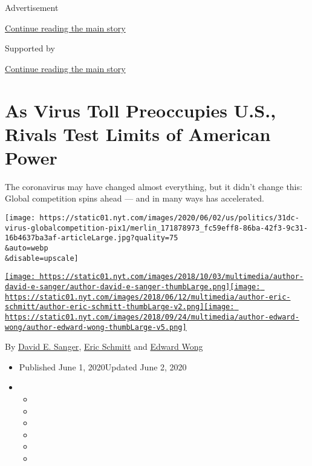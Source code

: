 Advertisement

\protect\hyperlink{after-top}{Continue reading the main story}

Supported by

\protect\hyperlink{after-sponsor}{Continue reading the main story}

\hypertarget{as-virus-toll-preoccupies-us-rivals-test-limits-of-american-power}{%
\section{As Virus Toll Preoccupies U.S., Rivals Test Limits of American
Power}\label{as-virus-toll-preoccupies-us-rivals-test-limits-of-american-power}}

The coronavirus may have changed almost everything, but it didn't change
this: Global competition spins ahead --- and in many ways has
accelerated.

\texttt{[image: https://static01.nyt.com/images/2020/06/02/us/politics/31dc-virus-globalcompetition-pix1/merlin\_171878973\_fc59eff8-86ba-42f3-9c31-16b4637ba3af-articleLarge.jpg?quality=75\\\&auto=webp\\\&disable=upscale]}

\href{https://www.nytimes.com/by/david-e-sanger}{\texttt{[image: https://static01.nyt.com/images/2018/10/03/multimedia/author-david-e-sanger/author-david-e-sanger-thumbLarge.png]}}\href{https://www.nytimes.com/by/eric-schmitt}{\texttt{[image: https://static01.nyt.com/images/2018/06/12/multimedia/author-eric-schmitt/author-eric-schmitt-thumbLarge-v2.png]}}\href{https://www.nytimes.com/by/edward-wong}{\texttt{[image: https://static01.nyt.com/images/2018/09/24/multimedia/author-edward-wong/author-edward-wong-thumbLarge-v5.png]}}

By \href{https://www.nytimes.com/by/david-e-sanger}{David E. Sanger},
\href{https://www.nytimes.com/by/eric-schmitt}{Eric Schmitt} and
\href{https://www.nytimes.com/by/edward-wong}{Edward Wong}

\begin{itemize}
\item
  Published June 1, 2020Updated June 2, 2020
\item
  \begin{itemize}
  \item
  \item
  \item
  \item
  \item
  \item
  \end{itemize}
\end{itemize}


